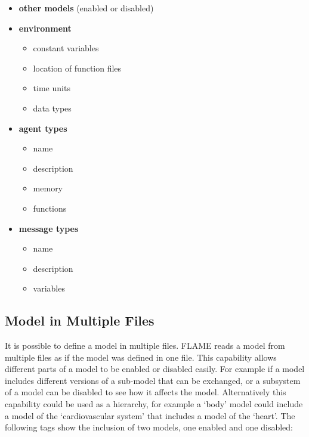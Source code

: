 \begin{itemize}
\item \textbf{other models} (enabled or disabled)
\item \textbf{environment}
\begin{itemize}
\item constant variables
\item location of function files
\item time units
\item data types
\end{itemize}
\item \textbf{agent types}
\begin{itemize}
\item name
\item description
\item memory
\item functions
\end{itemize}
\item \textbf{message types}
\begin{itemize}
\item name
\item description
\item variables
\end{itemize}
\end{itemize}

\subsection{Model in Multiple Files}

It is possible to define a model in multiple files. FLAME reads a model from
multiple files as if the model was defined in one file. This capability allows
different parts of a model to be enabled or disabled easily. For example if a
model includes different versions of a sub-model that can be exchanged, or a
subsystem of a model can be disabled to see how it affects the model.
Alternatively this capability could be used as a hierarchy, for example a `body'
model could include a model of the `cardiovascular system' that includes a
model of the `heart'. The following tags show the inclusion of two models, one
enabled and one disabled:

